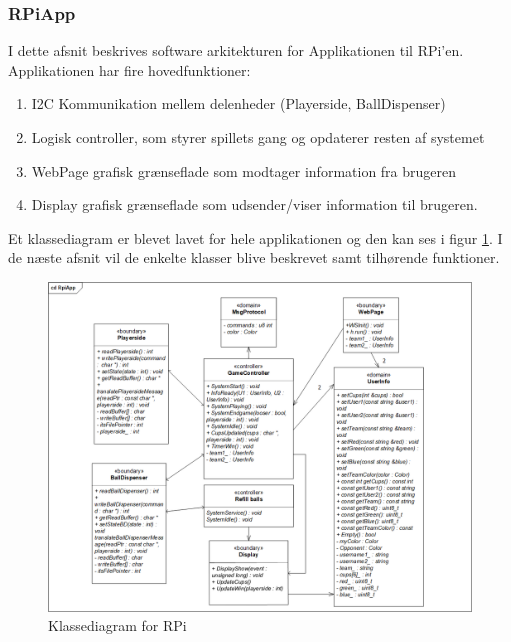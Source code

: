 \documentclass[Arkitektur/System_main.tex]{subfiles}
\begin{document}
\subsubsection{RPiApp} \label{sec:rpiapp_application_model}
I dette afsnit beskrives software arkitekturen for Applikationen til RPi'en. Applikationen har fire hovedfunktioner:
\begin{enumerate}
    \item I2C Kommunikation mellem delenheder (Playerside, BallDispenser)
    \item Logisk controller, som styrer spillets gang og opdaterer resten af systemet
    \item WebPage grafisk grænseflade som modtager information fra brugeren
    \item Display grafisk grænseflade som udsender/viser information til brugeren. 
\end{enumerate}
Et klassediagram er blevet lavet for hele applikationen og den kan ses i figur \ref{fig:CD_RPI}. I de næste afsnit vil de enkelte klasser blive beskrevet samt tilhørende funktioner. 
\begin{figure}[H]
    \centering
    \includegraphics[width=\textwidth]{Arkitektur/Softwarearkitektur/Applikationsmodel/RPi/graphics_RPi/Class.png}
    \caption{Klassediagram for RPi}
    \label{fig:CD_RPI}
\end{figure}
\end{document}
